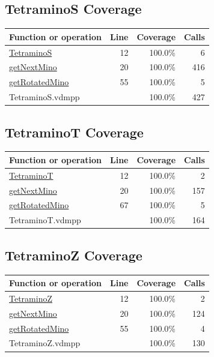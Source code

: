 \documentclass[a4paper]{article}
\begin{document}
\subsection{TetraminoS Coverage}
\begin{longtable}{|l|r|r|r|}
\hline
Function or operation & Line & Coverage & Calls \\
\hline
\hline
\hyperref[TetraminoS:12]{TetraminoS} & 12&100.0\% & 6 \\
\hline
\hyperref[getNextMino:20]{getNextMino} & 20&100.0\% & 416 \\
\hline
\hyperref[getRotatedMino:55]{getRotatedMino} & 55&100.0\% & 5 \\
\hline
\hline
TetraminoS.vdmpp & & 100.0\% & 427 \\
\hline
\end{longtable}

\subsection{TetraminoT Coverage}
\begin{longtable}{|l|r|r|r|}
\hline
Function or operation & Line & Coverage & Calls \\
\hline
\hline
\hyperref[TetraminoT:12]{TetraminoT} & 12&100.0\% & 2 \\
\hline
\hyperref[getNextMino:20]{getNextMino} & 20&100.0\% & 157 \\
\hline
\hyperref[getRotatedMino:67]{getRotatedMino} & 67&100.0\% & 5 \\
\hline
\hline
TetraminoT.vdmpp & & 100.0\% & 164 \\
\hline
\end{longtable}

\subsection{TetraminoZ Coverage}
\begin{longtable}{|l|r|r|r|}
\hline
Function or operation & Line & Coverage & Calls \\
\hline
\hline
\hyperref[TetraminoZ:12]{TetraminoZ} & 12&100.0\% & 2 \\
\hline
\hyperref[getNextMino:20]{getNextMino} & 20&100.0\% & 124 \\
\hline
\hyperref[getRotatedMino:55]{getRotatedMino} & 55&100.0\% & 4 \\
\hline
\hline
TetraminoZ.vdmpp & & 100.0\% & 130 \\
\hline
\end{longtable}
\end{document}
